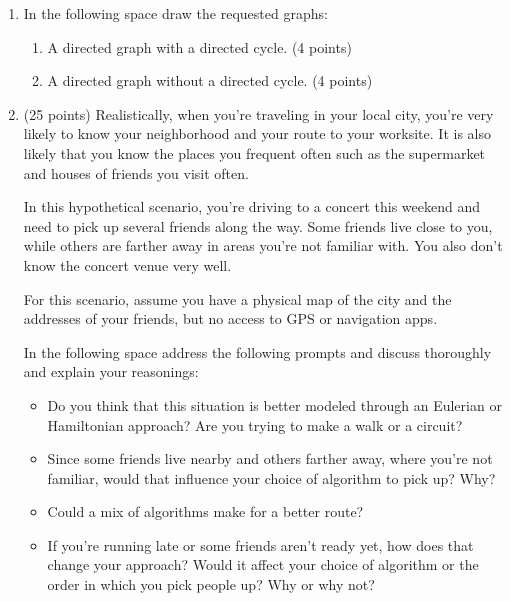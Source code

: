 \documentclass[12pt]{exam}
\begin{document}
\begin{enumerate}
\item In the following space draw the requested graphs:
\begin{enumerate}
    \item A directed graph with a directed cycle. (4 points)
    \vspace{3.5cm}
    \item A directed graph without a directed cycle. (4 points)
    \vfill
\end{enumerate}

\newpage
\item (25 points) Realistically, when you're traveling in your local city, you're very likely to know your neighborhood and your route to your worksite. It is also likely that you know the places you frequent often such as the supermarket and houses of friends you visit often.\par
In this hypothetical scenario, you're driving to a concert this weekend and need to pick up several friends along the way. Some friends live close to you, while others are farther away in areas you're not familiar with. You also don't know the concert venue very well.\par
For this scenario, assume you have a physical map of the city and the addresses of your friends, but no access to GPS or navigation apps.\par
In the following space address the following prompts and discuss thoroughly and explain your reasonings:
\begin{itemize}
    \item Do you think that this situation is better modeled through an Eulerian or Hamiltonian approach? Are you trying to make a walk or a circuit? 
    \item Since some friends live nearby and others farther away, where you're not familiar, would that influence your choice of algorithm to pick up? Why?
    \item Could a mix of algorithms make for a better route?
    \item If you're running late or some friends aren't ready yet, how does that change your approach? Would it affect your choice of algorithm or the order in which you pick people up? Why or why not?
\end{itemize}


\end{enumerate}
\end{document}
